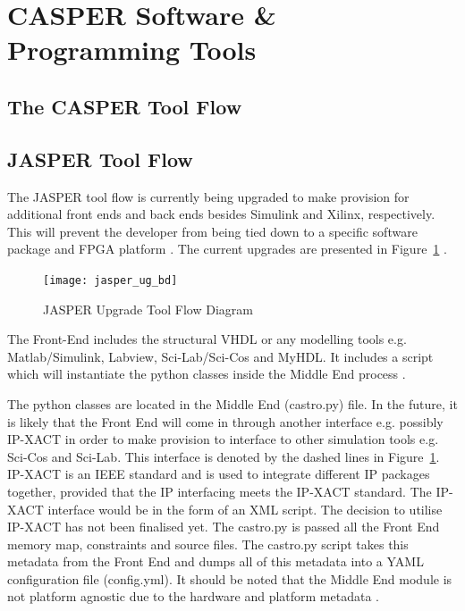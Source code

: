 \documentclass{ws-jai}
\begin{document}
\section{CASPER Software \& Programming Tools} \label{sec:Software}

\subsection{The CASPER Tool Flow}


\subsection{JASPER Tool Flow}


The JASPER tool flow is currently being upgraded to make provision for additional front ends and back ends besides Simulink and Xilinx, respectively. This will prevent the developer from being tied down to a specific software package and FPGA platform \cite{Isaac16}. The current upgrades are presented in Figure~\ref{fig:jasper_ug_bd} \cite{Isaac16}.

\begin{figure}[h]
\centering
\texttt{[image: jasper\_ug\_bd]}
\caption{JASPER Upgrade Tool Flow Diagram}
\label{fig:jasper_ug_bd}
\end{figure}

The Front-End includes the structural VHDL or any modelling tools e.g. Matlab/Simulink, Labview, Sci-Lab/Sci-Cos and MyHDL. It includes a script which will instantiate the python classes inside the Middle End process \cite{Isaac16}.

The python classes are located in the Middle End (castro.py) file. In the future, it is likely that the Front End will come in through another interface e.g. possibly IP-XACT in order to make provision to interface to other simulation tools e.g. Sci-Cos and Sci-Lab. This interface is denoted by the dashed lines in Figure~\ref{fig:jasper_ug_bd}. IP-XACT is an IEEE standard and is used to integrate different IP packages together, provided that the IP interfacing meets the IP-XACT standard. The IP-XACT interface would be in the form of an XML script. The decision to utilise IP-XACT has not been finalised yet. The castro.py is passed all the Front End memory map, constraints and source files. The castro.py script takes this metadata from the Front End and dumps all of this metadata into a YAML configuration file (config.yml). It should be noted that the Middle End module is not platform agnostic due to the hardware and platform metadata \cite{Isaac16}.
\end{document}
